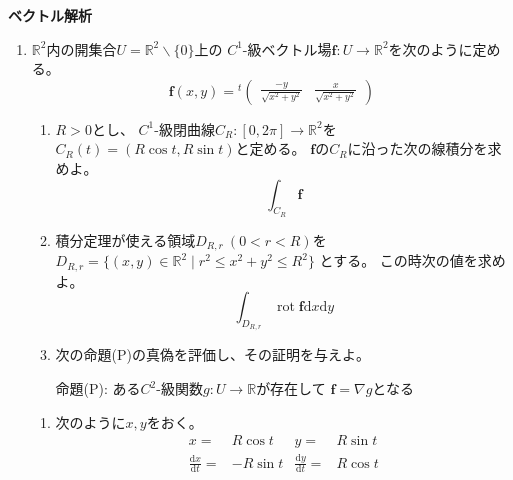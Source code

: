 \documentclass[12pt,b5paper]{ltjsarticle}
\DeclareMathOperator{\Rot}{rot}
\begin{document}
\textbf{ベクトル解析}

\hrulefill

\begin{enumerate}
 \item
      $\mathbb{R}^2$内の開集合$U=\mathbb{R}^2\backslash \{0\}$上の
      $C^1$-級ベクトル場$\bm{f}:U\to\mathbb{R}^2$を次のように定める。
      \begin{equation}
       \bm{f}(x,y)={}^{t}\begin{pmatrix} \frac{-y}{\sqrt{x^2+y^2}} & \frac{x}{\sqrt{x^2+y^2}} \end{pmatrix}
      \end{equation}
       \begin{enumerate}
        \item
             $R>0$とし、
             $C^1$-級閉曲線$C_{R}:[0,2\pi]\to\mathbb{R}^2$を
             $C_{R}(t)=(R\cos t, R\sin t)$と定める。
             $\bm{f}$の$C_R$に沿った次の線積分を求めよ。
             \begin{equation}
              \int_{C_R}\bm{f}
             \end{equation}


        \item
             積分定理が使える領域$D_{R,r}\ (0<r<R)$を
             $D_{R,r}=\{(x,y)\in\mathbb{R}^2 \mid r^2\leq x^2+y^2\leq R^2\}$
             とする。
             この時次の値を求めよ。
             \begin{equation}
              \int_{D_{R,r}}\Rot\bm{f}\mathrm{d}x\mathrm{d}y
             \end{equation}

        \item
             次の命題(P)の真偽を評価し、その証明を与えよ。
             \begin{center}
              命題(P): ある$C^2$-級関数$g:U\to\mathbb{R}$が存在して
              $\bm{f}=\nabla g$となる
             \end{center}

       \end{enumerate}

      \dotfill

      \begin{enumerate}
       \item
            次のように$x,y$をおく。
            \begin{align}
             x =& R\cos t & y =& R\sin t\\
             \frac{\mathrm{d}x}{\mathrm{d}t} =& -R\sin t & \frac{\mathrm{d}y}{\mathrm{d}t} =& R\cos t
            \end{align}


\end{enumerate}
\end{enumerate}
\end{document}
